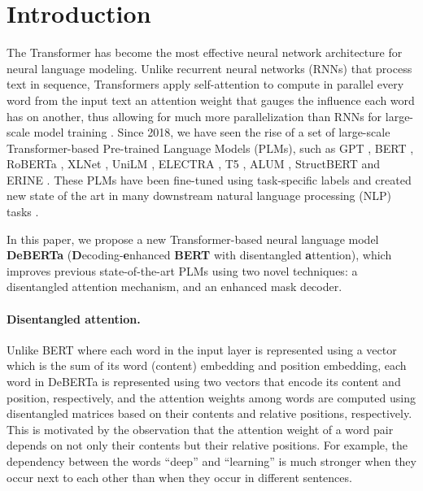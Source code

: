 \documentclass{article}
\begin{document}
 
\section{Introduction}
The Transformer has become the most effective neural network architecture for neural language modeling. 
Unlike recurrent neural networks (RNNs) that process text in sequence, Transformers apply self-attention to compute in parallel every word from the input text an attention weight that gauges the influence each word has on another, thus allowing for much more parallelization than RNNs for large-scale model training \citep{vaswani2017attention}. 
Since 2018, we have seen the rise of a set of large-scale Transformer-based Pre-trained Language Models (PLMs), such as 
GPT \citep{radford2019language,brown2020language},
BERT \citep{devlin2018bert}, 
RoBERTa \citep{liu2019roberta}, 
XLNet \citep{yang2019xlnet}, 
UniLM \citep{dong2019unilm},
ELECTRA \citep{clark2020electra},
T5 \citep{raffel2019t5},
ALUM \citep{liu2020alum},
StructBERT \citep{wang2019structbert} and
ERINE \citep{sun2019ernie}
. 
These PLMs have been fine-tuned using task-specific labels and created new state of the art in
many downstream natural language processing (NLP) tasks \citep{liu2019mt-dnn,minaee2020deep, jiang2019smart,he2019hnn,he2019x,shen2020exploiting}. 

In this paper, we propose a new Transformer-based neural language model \textbf{DeBERTa} (\textbf{D}ecoding-\textbf{e}nhanced \textbf{BERT} with disentangled \textbf{a}ttention), which 
improves previous state-of-the-art PLMs using two novel techniques: a disentangled attention mechanism, and an enhanced mask decoder.


\paragraph{Disentangled attention.}
Unlike BERT where each word in the input layer is represented using a vector which is the sum of its word (content) embedding and position embedding, each word in DeBERTa is represented using two vectors that encode its content and position, respectively, and the attention weights among words are computed using disentangled matrices based on their contents and relative positions, respectively. This is motivated by the observation that the attention weight of a word pair depends on not only their contents but their relative positions. For example, the dependency between the words ``deep'' and ``learning'' is much stronger when they occur next to each other than when they occur in different sentences. 
\end{document}
